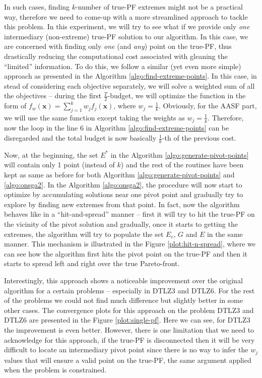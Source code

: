 \documentclass{sig-alternate-05-2015}
\begin{document}
In such cases, finding \(k\)-number of true-PF extremes might not be a practical way, therefore we need to come-up with a more streamlined approach to tackle this problem. In this experiment, we will try to see what if we provide only \textit{one} intermediary (non-extreme) true-PF solution to our algorithm. In this case, we are concerned with finding only \textit{one} (and \textit{any}) point on the true-PF, thus drastically reducing the computational cost associated with gleaning the ``limited'' information. To do this, we follow a similar (yet even more simple) approach as presented in the Algorithm \ref{algo:find-extreme-points}. In this case, in stead of considering each objective separately, we will solve a weighted sum of all the objectives -- during the first \(\frac{T}{2}\)-budget, we will optimize the function in the form of \(f_w(\mathbf{x}) = \sum_{j=1}^k w_j f_j(\mathbf{x})\), where \(w_j = \frac{1}{k}\). Obviously, for the AASF part, we will use the same function except taking the weights as \(w_j = \frac{1}{k}\). Therefore, now the loop in the line 6 in Algorithm \ref{algo:find-extreme-points} can be disregarded and the total budget is now basically \(\frac{1}{k}\)-th of the previous cost.

Now, at the beginning, the set \(E^\ast\) in the Algorithm \ref{algo:generate-pivot-points} will contain only 1 point (instead of \(k\)) and the rest of the routines have been kept as same as before for both Algorithm \ref{algo:generate-pivot-points} and \ref{algo:onsga2}. In the Algorithm \ref{algo:onsga2}, the procedure will now start to optimize by accumulating solutions near one pivot point and gradually try to explore by finding new extremes from that point. In fact, now the algorithm behaves like in a ``hit-and-spread'' manner -- first it will try to hit the true-PF on the vicinity of the pivot solution and gradually, once it starts to getting the extremes, the algorithm will try to populate the set \(E_c\), \(G\) and \(E\) in the same manner. This mechanism is illustrated in the Figure \ref{plot:hit-n-spread}, where we can see how the algorithm first hits the pivot point on the true-PF and then it starts to spread left and right over the true Pareto-front.

Interestingly, this approach shows a noticeable improvement over the original algorithm for a certain problems -- especially in DTLZ3 and DTLZ6. For the rest of the problems we could not find much difference but slightly better in some other cases. The convergence plots for this approach on the problem DTLZ3 and DTLZ6 are presented in the Figure \ref{plot:single-pf}. Here we can see, for DTLZ3 the improvement is even better. However, there is one limitation that we need to acknowledge for this approach, if the true-PF is disconnected then it will be very difficult to locate an intermediary pivot point since there is no way to infer the \(w_j\) values that will ensure a valid point on the true-PF, the same argument applied when the problem is constrained.
\end{document}
